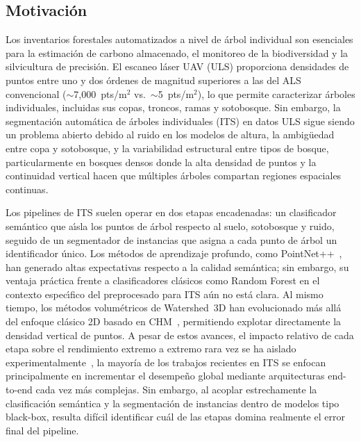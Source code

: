 \documentclass[runningheads]{llncs}
\begin{document}
\subsection{Motivaci\'on}

Los inventarios forestales automatizados a nivel de \'arbol individual son esenciales para la estimaci\'on de carbono almacenado, el monitoreo de la biodiversidad y la silvicultura de precisi\'on. El escaneo l\'aser UAV (ULS) proporciona densidades de puntos entre uno y dos \'ordenes de magnitud superiores a las del ALS convencional ($\sim$7{,}000~pts/m$^2$ vs.\ $\sim$5~pts/m$^2$), lo que permite caracterizar \'arboles individuales, incluidas sus copas, troncos, ramas y sotobosque. Sin embargo, la segmentaci\'on autom\'atica de \'arboles individuales (ITS) en datos ULS sigue siendo un problema abierto debido al ruido en los modelos de altura, la ambig\"uedad entre copa y sotobosque, y la variabilidad estructural entre tipos de bosque, particularmente en bosques densos donde la alta densidad de puntos y la continuidad vertical hacen que múltiples árboles compartan regiones espaciales continuas.



Los pipelines de ITS suelen operar en dos etapas encadenadas: un clasificador sem\'antico que a\'\i{}sla los puntos de \'arbol respecto al suelo, sotobosque y ruido, seguido de un segmentador de instancias que asigna a cada punto de \'arbol un identificador \'unico. Los m\'etodos de aprendizaje profundo, como PointNet++~\cite{qi2017}, han generado altas expectativas respecto a la calidad sem\'antica; sin embargo, su ventaja pr\'actica frente a clasificadores cl\'asicos como Random Forest en el contexto espec\'\i{}fico del preprocesado para ITS a\'un no est\'a clara. Al mismo tiempo, los m\'etodos volum\'etricos de Watershed~3D han evolucionado m\'as all\'a del enfoque cl\'asico 2D basado en CHM~\cite{dalponte2016}, permitiendo explotar directamente la densidad vertical de puntos. A pesar de estos avances, el impacto relativo de cada etapa sobre el rendimiento extremo a extremo rara vez se ha aislado experimentalmente~\cite{qi2017,breiman2001,puliti2023}, la mayoría de los trabajos recientes en ITS se enfocan principalmente en incrementar el desempeño global mediante arquitecturas end-to-end cada vez más complejas. Sin embargo, al acoplar estrechamente la clasificación semántica y la segmentación de instancias dentro de modelos tipo black-box, resulta difícil identificar cuál de las etapas domina realmente el error final del pipeline.
\end{document}
